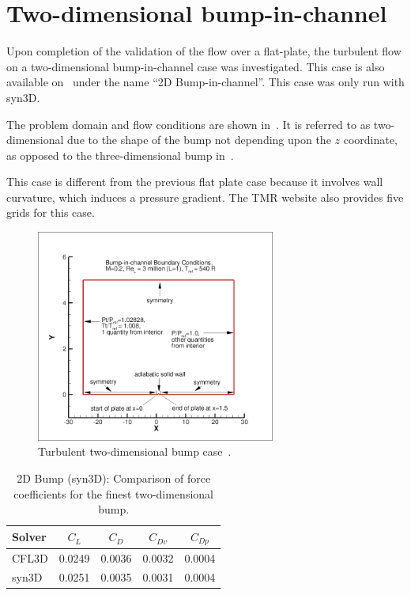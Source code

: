 \section{Two-dimensional bump-in-channel}
Upon completion of the validation of the flow over a flat-plate, the turbulent flow on a two-dimensional bump-in-channel case was investigated. This case is also available on~\cite{tmr} under the name ``2D Bump-in-channel''. This case was only run with syn3D.

The problem domain and flow conditions are shown in~. It is referred to as two-dimensional due to the shape of the bump not depending upon the $z$ coordinate, as opposed to the three-dimensional bump in~.

This case is different from the previous flat plate case because it involves wall curvature, which induces a pressure gradient. The TMR website also provides five grids for this case.
\begin{figure}
    \centering
    \includegraphics[width=0.7\textwidth]{figs/2dbump/bumpBCpic.jpg}
    \caption{Turbulent two-dimensional bump case~\cite{tmr}.}
    \label{fig:2dbump}
\end{figure}

\begin{table}[ht!]
    \centering
    \caption{2D Bump (syn3D): Comparison of force coefficients for the finest two-dimensional bump.}
\label{tab:syn2dbump1}
\begin{tabular}{@{}lcccc@{}}
\toprule
Solver & $C_L$ & $C_D$ & $C_{Dv}$ & $C_{Dp}$ \\
\midrule
CFL3D & 0.0249 & 0.0036  & 0.0032 & 0.0004  \\
syn3D & 0.0251 &  0.0035 & 0.0031 & 0.0004  \\  \bottomrule
\end{tabular}

\end{table}

